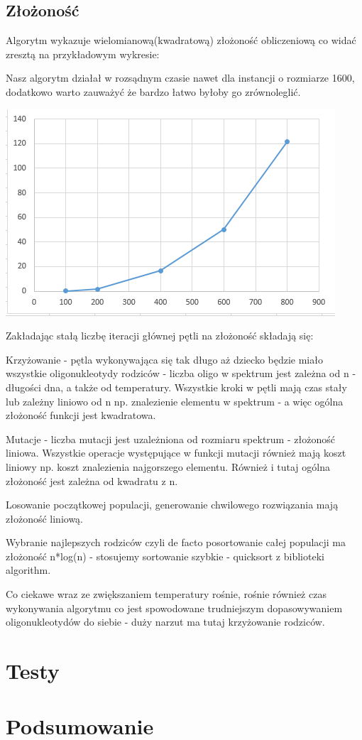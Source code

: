 \documentclass{article}
\begin{document}
\subsection{Złożoność}
Algorytm wykazuje wielomianową(kwadratową) złożoność obliczeniową co
widać zresztą na przykładowym wykresie:

Nasz algorytm działał w rozsądnym czasie nawet dla instancji o rozmiarze 1600, dodatkowo warto zauważyć że bardzo łatwo byłoby go zrównoleglić.

\includegraphics{genetic}

Zakładając stałą liczbę iteracji głównej pętli na złożoność składają się:

Krzyżowanie - pętla wykonywająca się tak długo aż dziecko będzie miało
wszystkie oligonukleotydy rodziców - liczba oligo w spektrum jest zależna
od n - długości dna, a także od temperatury. Wszystkie kroki w pętli mają
czas stały lub zależny liniowo od n np. znalezienie elementu w spektrum -
a więc ogólna złożoność funkcji jest kwadratowa.

Mutacje - liczba mutacji jest uzależniona od rozmiaru spektrum - złożoność liniowa. Wszystkie operacje występujące w funkcji mutacji również
mają koszt liniowy np. koszt znalezienia najgorszego elementu. Również i tutaj ogólna złożoność jest zależna od kwadratu z n.
           
Losowanie początkowej populacji, generowanie chwilowego rozwiązania mają złożoność liniową.

Wybranie najlepszych rodziców czyli de facto posortowanie całej populacji ma złożoność n*log(n) - stosujemy sortowanie szybkie - quicksort z biblioteki algorithm.

Co ciekawe wraz ze zwiększaniem temperatury rośnie, rośnie również czas wykonywania algorytmu co jest spowodowane trudniejszym dopasowywaniem oligonukleotydów do siebie - duży narzut ma tutaj krzyżowanie rodziców.

\section{Testy}

\section{Podsumowanie}
\end{document}
